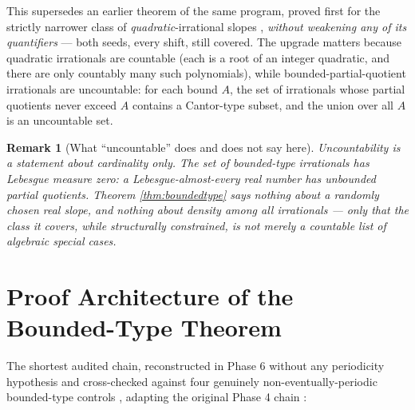 \documentclass[11pt]{article}
\newtheorem*{remark}{Remark}
\begin{document}
This supersedes an earlier theorem of the same program, proved first for the strictly narrower class of \emph{quadratic}-irrational slopes \cite{Phase4Quadratic}, \emph{without weakening any of its quantifiers} --- both seeds, every shift, still covered. The upgrade matters because quadratic irrationals are countable (each is a root of an integer quadratic, and there are only countably many such polynomials), while bounded-partial-quotient irrationals are uncountable: for each bound $A$, the set of irrationals whose partial quotients never exceed $A$ contains a Cantor-type subset, and the union over all $A$ is an uncountable set.

\begin{remark}[What ``uncountable'' does and does not say here]
Uncountability is a statement about cardinality only. The set of bounded-type irrationals has Lebesgue measure zero: a Lebesgue-almost-every real number has \emph{unbounded} partial quotients. Theorem \ref{thm:boundedtype} says nothing about a randomly chosen real slope, and nothing about density among all irrationals --- only that the class it covers, while structurally constrained, is not merely a countable list of algebraic special cases.
\end{remark}

\section{Proof Architecture of the Bounded-Type Theorem}
\label{sec:architecture}

The shortest audited chain, reconstructed in Phase 6 without any periodicity hypothesis and cross-checked against four genuinely non-eventually-periodic bounded-type controls \cite{Phase6Arrow}, adapting the original Phase 4 chain \cite{Phase4Chain}:
\end{document}
